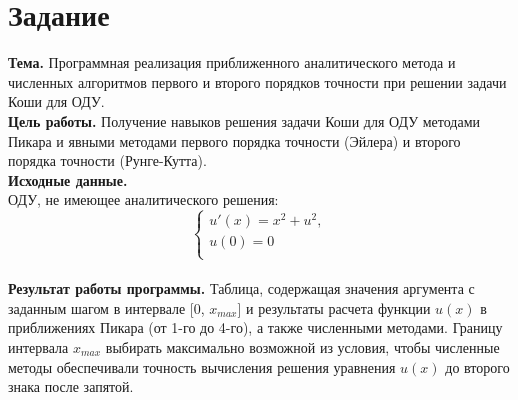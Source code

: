 \section*{Задание}

\qquad\textbf{Тема. } Программная реализация приближенного аналитического метода и численных алгоритмов первого и второго порядков точности при решении задачи Коши для ОДУ.\\

\textbf{Цель работы. } Получение навыков решения задачи Коши для ОДУ методами Пикара и явными методами первого порядка точности (Эйлера) и второго порядка точности (Рунге-Кутта).
\\

\textbf{Исходные данные. }\\
ОДУ, не имеющее аналитического решения:\\
\begin{equation}\label{formula1}
	\left\{
	\begin{array}{ccc}
		u'(x) = x^2 + u^2,\\
		u(0) = 0\\
	\end{array}
	\right.
\end{equation}\\

\textbf{Результат работы программы.} Таблица, содержащая значения аргумента с заданным шагом в интервале [0, $x_{max}$] и результаты расчета функции $u(x)$ в приближениях Пикара (от 1-го до 4-го), а также численными методами. Границу интервала $x_{max}$ выбирать максимально возможной из условия, чтобы численные методы обеспечивали точность вычисления решения уравнения $u(x)$ до второго знака после запятой. \\
